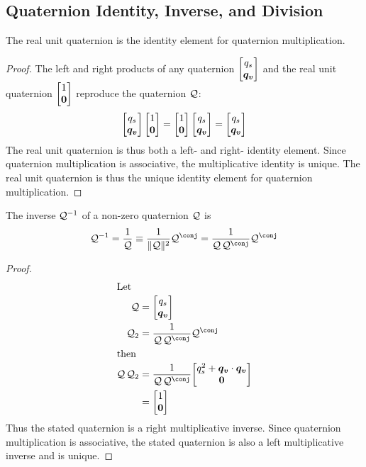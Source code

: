\subsection{Quaternion Identity, Inverse, and Division}

\begin{theorem}\label{thm:quat_identity}
The real unit quaternion is the identity element for quaternion multiplication.
\end{theorem}
\begin{proof}
The left and right products of any quaternion
$\quatsv {q_s}{\vect{q_v}}$ and the real unit quaternion $\quatsv 1 {\vect 0}$
reproduce the quaternion $\mathcal{Q}$:
\begin{equation*}
  \QxQ{\quatsv {q_s}{\vect{q_v}}}{\quatsv 1 {\vect 0}} =
  \QxQ{\quatsv 1 {\vect 0}}{\quatsv {q_s}{\vect{q_v}}} =
  \quatsv {q_s}{\vect{q_v}}
\end{equation*}
The real unit quaternion is thus both a left- and right- identity element.
Since quaternion multiplication is associative,
the multiplicative identity is unique.
The real unit quaternion is thus the unique identity element
for quaternion multiplication.
\end{proof}

\begin{theorem}\label{thm:quat_inverse}
The inverse $\mathcal{Q} ^ {-1} $ of a non-zero quaternion $\mathcal{Q}$ is
\begin{equation}
\quat Q ^ {-1} = \frac{1}{\quat Q}
  \equiv \frac{1}{\norm{\quat Q}^2} \quatconj Q
  = \frac{1}{\QxQ {\quat Q} {\quatconj Q}} \quatconj Q
\label{eqn:quat_inverse_def}
\end{equation}
\end{theorem}
\begin{proof}
\begin{align*}
\intertext{Let}
  \quat Q &= \quatsv {q_s}{\vect{q_v}} \\
  \quat Q_2 &= \frac{1}{\QxQ {\quat Q} {\quatconj Q}} \quatconj Q \\
\intertext{then}
  \QxQ {\quat Q}{\quat Q_2}
    &= \frac{1}{\QxQ {\quat Q} {\quatconj Q}}
      \quatsv {q_s^2 + \vect{q_v} \cdot \vect{q_v}} {\vect 0} \\
    &= \quatsv 1 {\vect 0}
\end{align*}
Thus the stated quaternion is a right multiplicative inverse.
Since quaternion multiplication is associative,
the stated quaternion is also a left multiplicative inverse and is unique.
\end{proof}

